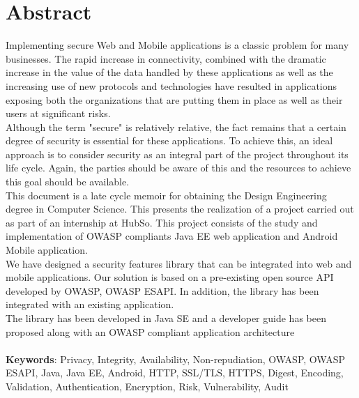 
\chapter*{Abstract}

Implementing secure Web and Mobile applications is a classic problem for many businesses. The rapid increase in connectivity, combined with the dramatic increase in the value of the data handled by these applications as well as the increasing use of new protocols and technologies have resulted in applications exposing both the organizations that are putting them in place as well as their users at significant risks.\\
Although the term "secure" is relatively relative, the fact remains that a certain degree of security is essential for these applications. To achieve this, an ideal approach is to consider security as an integral part of the project throughout its life cycle. Again, the parties should be aware of this and the resources to achieve this goal should be available.\\
This document is a late cycle memoir for obtaining the Design Engineering degree in Computer
Science. This presents the realization of a project carried out as part of an internship at HubSo. This project consists of the study and implementation of OWASP compliants Java EE web application and Android Mobile application.\\
We have designed a security features library that can be integrated into web and mobile applications. Our solution is based on a pre-existing open source API developed by OWASP, OWASP ESAPI. In addition, the library has been integrated with an existing application.\\
The library has been developed in Java SE and a developer guide has been proposed along with an OWASP compliant application architecture\\ \\
\textbf{Keywords}: Privacy, Integrity, Availability, Non-repudiation, OWASP, OWASP ESAPI, Java, Java EE, Android, HTTP, SSL/TLS, HTTPS, Digest, Encoding, Validation, Authentication, Encryption, Risk, Vulnerability, Audit


\clearpage

